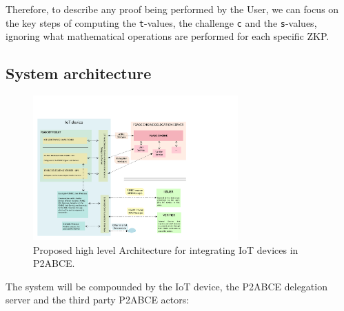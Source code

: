 Therefore, to describe any proof being performed by the User, we can focus on the key steps of computing the \texttt{t}-values, the challenge \texttt{c} and the \texttt{s}-values, ignoring what mathematical operations are performed for each specific ZKP.



\subsection{System architecture}


\begin{figure}[htb!]
	\centering
	\includegraphics[width=0.7\textwidth]{gfx/P2ABCE-IoT-color}
	\caption{Proposed high level Architecture for integrating IoT devices in P2ABCE.}
	\label{fig:P2ABCE-IoT}
\end{figure}


\hfil


The system will be compounded by the IoT device, the P2ABCE delegation server and the third party P2ABCE actors:

